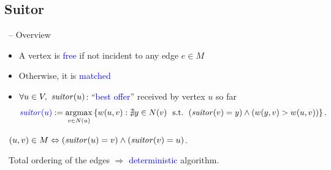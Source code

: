 \documentclass[10pt,titlepage,english,presentation]{beamer}
\newcommand{\emphcolor}{blue}
\renewcommand{\emph}[1]{\textcolor{\emphcolor}{#1}}
\begin{document}
\subsection{Suitor}
\begin{frame}[t]{\suitor\ -- Overview}
\small\vspace{-4mm}
\begin{block}{\vspace{-3ex}}
\begin{itemize}
\small
    \item A vertex is \emph{free} if not incident to any edge $e\in M$
    \item Otherwise, it is \emph{matched}
    \item $\forall u \in V,\ \mathit{suitor}(u)$: \enquote{\emph{best offer}} received by vertex $u$ so far
$$
\textcolor{\emphcolor}{\vsuitor(u)}
:= \argmax_{v \in N(u)}\set{w(u, v) : \nexists y \in N(v)\ \text{ s.t. }
\roundb{\vsuitor(v) = y} \wedge \roundb{w(y, v) > w(u, v)}}.
$$
\end{itemize}\vspace{-1mm}

\faHandORight\ $(u, v) \in M \Leftrightarrow \left(\mathit{suitor}(u) = v\right) \wedge
\left(\mathit{suitor}(v) = u\right)$.\smallskip

\faExclamationCircle\ Total ordering of the edges $\Rightarrow$
\emph{deterministic} algorithm.
\end{block}



\end{frame}
\end{document}

